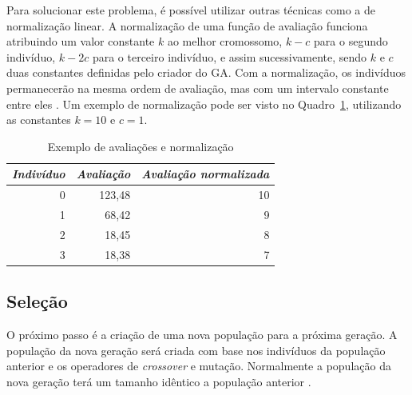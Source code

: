 \documentclass[12pt,oneside,a4paper,english,french,spanish,brazil,]{abntex2}
\begin{document}
Para solucionar este problema, é possível utilizar outras técnicas como a de normalização linear. A normalização de uma função de avaliação funciona atribuindo um valor constante \(k\) ao melhor cromossomo, \(k - c\) para o segundo indivíduo, \(k - 2c\) para o terceiro indivíduo, e assim sucessivamente, sendo \(k\) e \(c\) duas constantes definidas pelo criador do GA. Com a normalização, os indivíduos permanecerão na mesma ordem de avaliação, mas com um intervalo constante entre eles  \cite{linden:2008}. Um exemplo de normalização pode ser visto no Quadro~\ref{tab:Normalizacao_Avaliacao}, utilizando as constantes \(k = 10\) e \(c = 1\).

\begin{table}[tbp]
\centering
\caption{Exemplo de avaliações e normalização}
\label{tab:Normalizacao_Avaliacao}
\begin{tabular}{rrr}
\hline
\multicolumn{1}{l}{\textit{\textbf{Indivíduo}}} & \multicolumn{1}{l}{\textit{\textbf{Avaliação}}} & \multicolumn{1}{l}{\textit{\textbf{Avaliação normalizada}}} \\ \hline
0                                                & 123,48                                           & 10                                                           \\
1                                                & 68,42                                            & 9                                                            \\
2                                                & 18,45                                            & 8                                                            \\
3                                                & 18,38                                            & 7    \\ \hline                                                       
\end{tabular}
\end{table}

\subsection{Seleção}

O próximo passo é a criação de uma nova população para a próxima geração. A população da nova geração será criada com base nos indivíduos da população anterior e os operadores de \textit{crossover} e mutação. Normalmente a população da nova geração terá um tamanho idêntico a população anterior \cite{linden:2008}.
\end{document}
